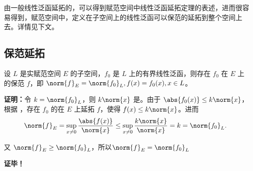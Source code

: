 

由一般线性泛函延拓的，可以得到赋范空间中线性泛函延拓定理的表述，进而很容易得到，赋范空间中，定义在子空间上的线性泛函可以保范的延拓到整个空间上去。详情见下文。

\subsection{保范延拓}

\begin{theorem}{}
设 $L$ 是实赋范空间 $E$ 的子空间，$f_0$ 是 $L$ 上的有界线性泛函，则存在 $f_0$ 在 $E$ 上的保范 $f$，即 $\norm{f}_{E}=\norm{f_0}_{L},f(x)=f_0(x),x\in L$。
\end{theorem}

\textbf{证明：}令 $k=\norm{f_0}_{L}$，则 $k\norm{x}$ 是。由于 $\abs{f_0(x)}\leq k\norm{x}$，根据 ，存在 $f_0$ 的在 $E$ 上延拓 $f$，使得 $f(x)\leq k\norm{x}$。进而
\begin{equation}
\norm{f}_E=\sup_{x\neq0}\frac{\abs{f(x)}}{\norm{x}}\leq\sup_{x\neq0}\frac{k\norm{x}}{\norm{x}}=k=\norm{f_0}_L.~
\end{equation}
 
又 $\norm{f}_E\geq \norm{f_0}_L$，所以$\norm{f}_{E}=\norm{f_0}_{L}$ 


\textbf{证毕！}
